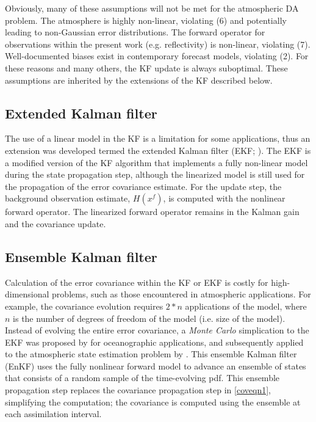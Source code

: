 Obviously, many of these assumptions will not be met for the atmospheric DA problem. The atmosphere is highly non-linear, violating (6) and potentially leading to non-Gaussian error distributions.
The forward operator for observations within the present work (e.g. reflectivity) is non-linear, violating (7). Well-documented biases exist in contemporary forecast models, violating (2). For these reasons and many others, the KF update is always suboptimal. These assumptions are inherited by the extensions of the KF described below.

\subsection{Extended Kalman filter}
The use of a linear model in the KF is a limitation for some applications, thus an extension was developed termed the extended Kalman filter (EKF; \citealt{jazwinski70}). The EKF is a modified version of the KF algorithm that implements a fully non-linear model during the state propagation step, although the linearized model is still used for the propagation of the error covariance estimate. For the update step, the background observation estimate, \(H(x^f)\), is computed with the nonlinear forward operator. The linearized forward operator remains in the Kalman gain and the covariance update.

\subsection{Ensemble Kalman filter}
Calculation of the error covariance within the KF or EKF is costly for high-dimensional problems, such as those encountered in atmospheric applications. For example, the covariance evolution requires \(2*n\) applications of the model, where \(n\) is the number of degrees of freedom of the model (i.e. size of the model). Instead of evolving the entire error covariance, a {\it Monte Carlo} simplication to the EKF was proposed by \citet{evensen94} for oceanographic applications, and subsequently applied to the atmospheric state estimation problem by \citet{houtekamermitchell98}. This ensemble Kalman filter (EnKF) uses the fully nonlinear forward model to advance an ensemble of states that consists of a random sample of the time-evolving pdf. This ensemble propagation step replaces the covariance propagation step in \ref{coveqn1}, simplifying the computation; the covariance is computed using the ensemble at each assimilation interval. 

